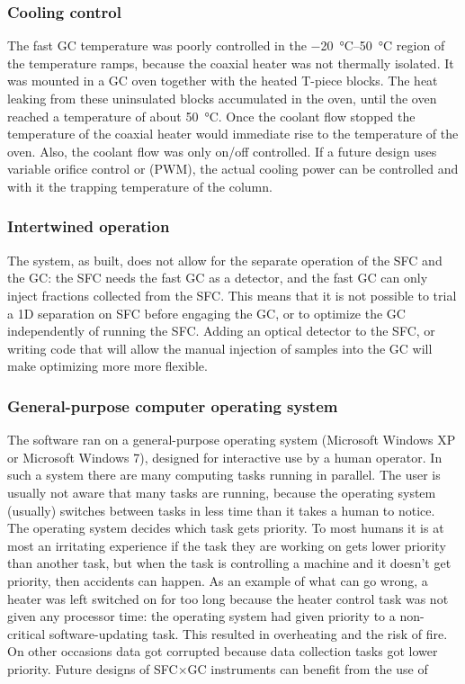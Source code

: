\subsubsection{Cooling control}

The fast GC temperature was poorly controlled in the \SIrange{-20}{50}{\celsius}
region of the temperature ramps, because the coaxial heater was not thermally
isolated. It was mounted in a GC oven together with the heated T-piece blocks.
The heat leaking from these uninsulated blocks accumulated in the oven, until
the oven reached a temperature of about \SI{50}{\celsius}. Once the coolant flow
stopped the temperature of the coaxial heater would immediate rise to the
temperature of the oven. Also, the coolant flow was only on/off controlled. If a
future design uses variable orifice control or  (PWM), the actual cooling power can be controlled and with it the
trapping temperature of the column.

\subsubsection{Intertwined operation}

The system, as built, does not allow for the separate operation of the SFC and
the GC: the SFC needs the fast GC as a detector, and the fast GC can only inject
fractions collected from the SFC. This means that it is not possible to trial a
1D separation on SFC before engaging the \twoD GC, or to optimize the GC
independently of running the SFC. Adding an optical detector to the SFC, or
writing code that will allow the manual injection of samples into the GC will
make optimizing more more flexible.

\subsubsection{General-purpose computer operating system}

The software ran on a general-purpose operating system (Microsoft Windows XP or
Microsoft Windows 7), designed for interactive use by a human operator. In such
a system there are many computing tasks running in parallel. The user is usually
not aware that many tasks are running, because the operating system (usually)
switches between tasks in less time than it takes a human to notice. The
operating system decides which task gets priority. To most humans it is at most
an irritating experience if the task they are working on gets lower priority
than another task, but when the task is controlling a machine and it doesn't get
priority, then accidents can happen. As an example of what can go wrong, a
heater was left switched on for too long because the heater control task was not
given any processor time: the operating system had given priority to a
non-critical software-updating task. This resulted in overheating and the risk
of fire. On other occasions data got corrupted because data collection tasks got
lower priority. Future designs of SFC×GC instruments can benefit from the use of

